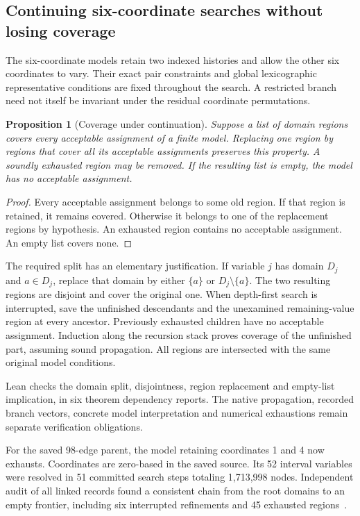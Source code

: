 \documentclass[11pt,a4paper]{article}
\newtheorem{proposition}[theorem]{Proposition}
\theoremstyle{definition}
\theoremstyle{remark}
\begin{document}
\subsection{Continuing six-coordinate searches without losing coverage}
\label{sec:history208}
The six-coordinate models retain two indexed histories and allow the
other six coordinates to vary. Their exact pair constraints and global
lexicographic representative conditions are fixed throughout the search.
A restricted branch need not itself be invariant under the residual
coordinate permutations.

\begin{proposition}[Coverage under continuation]
Suppose a list of domain regions covers every acceptable assignment of
a finite model. Replacing one region by regions that cover all its
acceptable assignments preserves this property. A soundly exhausted
region may be removed. If the resulting list is empty, the model has
no acceptable assignment.
\end{proposition}
\begin{proof}
Every acceptable assignment belongs to some old region. If that region
is retained, it remains covered. Otherwise it belongs to one of the
replacement regions by hypothesis. An exhausted region contains no
acceptable assignment. An empty list covers none.
\end{proof}

The required split has an elementary justification. If variable $j$
has domain $D_j$ and $a\in D_j$, replace that domain by either
$\{a\}$ or $D_j\setminus\{a\}$. The two resulting regions are
disjoint and cover the original one. When depth-first search is
interrupted, save the unfinished descendants and the unexamined
remaining-value region at every ancestor. Previously exhausted
children have no acceptable assignment. Induction along the recursion
stack proves coverage of the unfinished part, assuming sound propagation.
All regions are intersected with the same original model conditions.

Lean checks the domain split, disjointness, region replacement and
empty-list implication, in six theorem dependency reports. The native
propagation, recorded branch vectors, concrete model interpretation and
numerical exhaustions remain separate verification obligations.

For the saved 98-edge parent, the model retaining coordinates 1 and 4
now exhausts. Coordinates are zero-based in the saved source. Its 52
interval variables were resolved in 51 committed search steps totaling
1,713,998 nodes. Independent audit of all linked records found a
consistent chain from the root domains to an empty frontier, including
six interrupted refinements and 45 exhausted regions~\cite{research208}.
\end{document}
